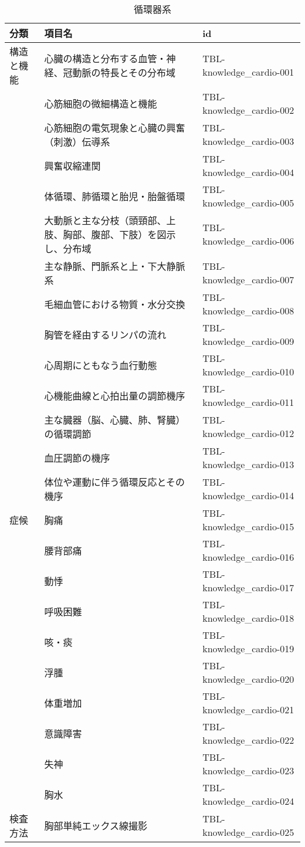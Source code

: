 \begin{xltabular}{\linewidth}{XXX}
\caption{\label{tbl:knowledge_cardio}循環器系} \\
\toprule
分類 & 項目名 & id \\
\midrule
\endhead
構造と機能 & 心臓の構造と分布する血管・神経、冠動脈の特長とその分布域 & TBL-knowledge_cardio-001 \\
 & 心筋細胞の微細構造と機能 & TBL-knowledge_cardio-002 \\
 & 心筋細胞の電気現象と心臓の興奮（刺激）伝導系 & TBL-knowledge_cardio-003 \\
 & 興奮収縮連関 & TBL-knowledge_cardio-004 \\
 & 体循環、肺循環と胎児・胎盤循環 & TBL-knowledge_cardio-005 \\
 & 大動脈と主な分枝（頭頸部、上肢、胸部、腹部、下肢）を図示し、分布域 & TBL-knowledge_cardio-006 \\
 & 主な静脈、門脈系と上・下大静脈系 & TBL-knowledge_cardio-007 \\
 & 毛細血管における物質・水分交換 & TBL-knowledge_cardio-008 \\
 & 胸管を経由するリンパの流れ & TBL-knowledge_cardio-009 \\
 & 心周期にともなう血行動態 & TBL-knowledge_cardio-010 \\
 & 心機能曲線と心拍出量の調節機序 & TBL-knowledge_cardio-011 \\
 & 主な臓器（脳、心臓、肺、腎臓）の循環調節 & TBL-knowledge_cardio-012 \\
 & 血圧調節の機序 & TBL-knowledge_cardio-013 \\
 & 体位や運動に伴う循環反応とその機序 & TBL-knowledge_cardio-014 \\
症候 & 胸痛 & TBL-knowledge_cardio-015 \\
 & 腰背部痛 & TBL-knowledge_cardio-016 \\
 & 動悸 & TBL-knowledge_cardio-017 \\
 & 呼吸困難 & TBL-knowledge_cardio-018 \\
 & 咳・痰 & TBL-knowledge_cardio-019 \\
 & 浮腫 & TBL-knowledge_cardio-020 \\
 & 体重増加 & TBL-knowledge_cardio-021 \\
 & 意識障害 & TBL-knowledge_cardio-022 \\
 & 失神 & TBL-knowledge_cardio-023 \\
 & 胸水 & TBL-knowledge_cardio-024 \\
検査方法 & 胸部単純エックス線撮影 & TBL-knowledge_cardio-025 \\

\end{xltabular}
